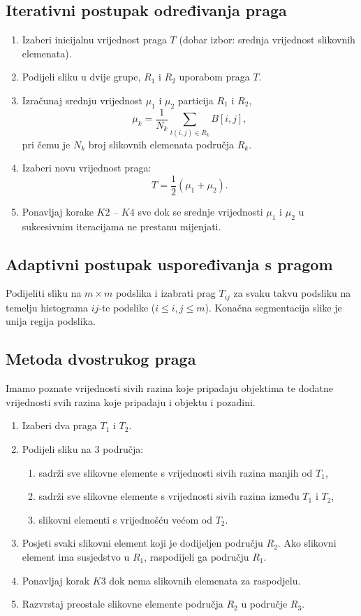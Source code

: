 \documentclass[11pt,english]{article}
\begin{document}
\subsection{Iterativni postupak određivanja praga}
\begin{enumerate}
  \item Izaberi inicijalnu vrijednost praga $T$ (dobar izbor: srednja vrijednost slikovnih elemenata).
  \item Podijeli sliku u dvije grupe, $R_1$ i $R_2$ uporabom praga $T$.
  \item Izračunaj srednju vrijednost $\mu_1$ i $\mu_2$ particija $R_1$ i $R_2$,
  $$\mu_k = \frac{1}{N_k}\sum_{t(i,j)\in R_k} B[i,j],$$
  pri čemu je $N_k$ broj slikovnih elemenata područja $R_k$.
  \item Izaberi novu vrijednost praga:
  $$T = \dfrac{1}{2} \left ( \mu_1 + \mu_2 \right ).$$
  \item Ponavljaj korake $K2$ -- $K4$ sve dok se srednje vrijednosti $\mu_1$ i $\mu_2$ u sukcesivnim iteracijama ne prestanu mijenjati.
\end{enumerate}

\subsection{Adaptivni postupak uspoređivanja s pragom}
Podijeliti sliku na $m \times m$ podslika i izabrati prag $T_{ij}$ za svaku takvu podsliku na temelju histograma $ij$-te podslike ($i \leq i,j \leq m$). Konačna segmentacija slike je unija regija podslika.

\subsection{Metoda dvostrukog praga}
Imamo poznate vrijednosti sivih razina koje pripadaju objektima te dodatne vrijednosti svih razina koje pripadaju i objektu i pozadini.
\begin{enumerate}
  \item Izaberi dva praga $T_1$ i $T_2$.
  \item Podijeli sliku na 3 područja:
  \begin{enumerate}
    \item sadrži sve slikovne elemente s vrijednosti sivih razina manjih od $T_1$,
    \item sadrži sve slikovne elemente s vrijednosti sivih razina između $T_1$ i $T_2$,
    \item slikovni elementi s vrijednošću većom od $T_2$.
  \end{enumerate}
  \item Posjeti svaki slikovni element koji je dodijeljen području $R_2$. Ako  slikovni element ima susjedstvo u $R_1$, raspodijeli ga području $R_1$.
  \item Ponavljaj korak $K3$ dok nema slikovnih elemenata za raspodjelu.
  \item Razvrstaj preostale slikovne elemente područja $R_2$ u područje $R_3$.
\end{enumerate}
\end{document}
